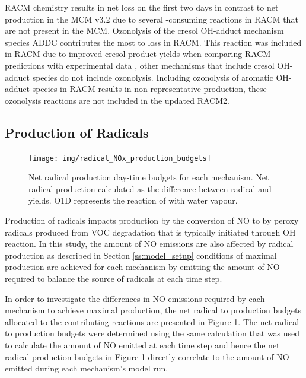RACM chemistry results in net  loss on the first two days in contrast to net  production in the MCM v3.2 due to several -consuming reactions in RACM that are not present in the MCM.
Ozonolysis of the cresol OH-adduct mechanism species ADDC contributes the most to  loss in RACM.
This reaction was included in RACM due to improved cresol product yields when comparing RACM predictions with experimental data \citep{Stockwell:1997}, other mechanisms that include cresol OH-adduct species do not include ozonolysis.
Including ozonolysis of aromatic OH-adduct species in RACM results in non-representative  production, these ozonolysis reactions are not included in the updated RACM2.

\subsection{Production of Radicals} \label{ss:radicals}

\begin{figure}
    \centering
    \texttt{[image: img/radical\_NOx\_production\_budgets]}
    \vspace{0mm}
    \caption{Net radical production day-time budgets for each mechanism. Net radical production calculated as the difference between radical and  yields. O1D represents the reaction of  with water vapour.}
    \vspace{-4mm}
    \label{f:radical_production} 
\end{figure} 

Production of radicals impacts  production by the conversion of NO to  by peroxy radicals produced from VOC degradation that is typically initiated through OH reaction.
In this study, the amount of NO emissions are also affected by radical production as described in Section \ref{ss:model_setup} conditions of maximal  production are achieved for each mechanism by emitting the amount of NO required to balance the source of radicals at each time step. 

In order to investigate the differences in NO emissions required by each mechanism to achieve maximal  production, the net radical to  production budgets allocated to the contributing reactions are presented in Figure \ref{f:radical_production}.
The net radical to  production budgets were determined using the same calculation that was used to calculate the amount of NO emitted at each time step and hence the net radical production budgets in Figure \ref{f:radical_production} directly correlate to the amount of NO emitted during each mechanism's model run.

